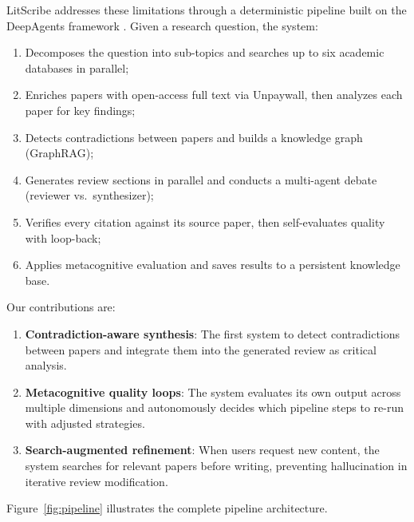 \documentclass[11pt]{article}
\begin{document}
LitScribe addresses these limitations through a deterministic pipeline built on the DeepAgents framework \citep{deepagents2025}. Given a research question, the system:
\begin{enumerate}[nosep]
    \item[\textbf{1--2.}] Decomposes the question into sub-topics and searches up to six academic databases in parallel;
    \item[\textbf{3--4.}] Enriches papers with open-access full text via Unpaywall, then analyzes each paper for key findings;
    \item[\textbf{5--6.}] Detects contradictions between papers and builds a knowledge graph (GraphRAG);
    \item[\textbf{7--8.}] Generates review sections in parallel and conducts a multi-agent debate (reviewer vs.\ synthesizer);
    \item[\textbf{9--10.}] Verifies every citation against its source paper, then self-evaluates quality with loop-back;
    \item[\textbf{11.}] Applies metacognitive evaluation and saves results to a persistent knowledge base.
\end{enumerate}

Our contributions are:
\begin{enumerate}[nosep]
    \item \textbf{Contradiction-aware synthesis}: The first system to detect contradictions between papers and integrate them into the generated review as critical analysis.
    \item \textbf{Metacognitive quality loops}: The system evaluates its own output across multiple dimensions and autonomously decides which pipeline steps to re-run with adjusted strategies.
    \item \textbf{Search-augmented refinement}: When users request new content, the system searches for relevant papers before writing, preventing hallucination in iterative review modification.
\end{enumerate}

Figure~\ref{fig:pipeline} illustrates the complete pipeline architecture.
\end{document}
